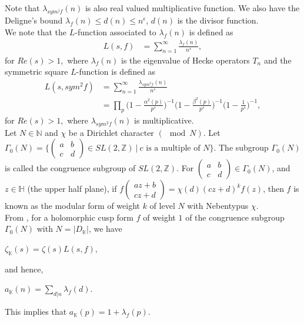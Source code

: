 \documentclass[preprint,12pt]{elsarticle}
\numberwithin{equation}{section}
\begin{document}
Note that $\lambda_{sym^{j}f}(n)$ is also real valued multiplicative function. We also have the Deligne's bound $\lambda_{f}(n)\leq d(n)\leq n^{\epsilon}$, $d(n)$ is the divisor function.\\
We note that the $L$-function associated to $\lambda_{f}(n)$ is defined as
\begin{align*}
	L(s,f)&=\sum_{n=1}^{\infty}\frac{\lambda_{f}(n)}{n^{s}}, 
\end{align*}
for $Re(s)>1,$ where $\lambda_{f}(n)$ is the eigenvalue of Hecke operators $T_{n}$ and the symmetric square $L$-function is defined as
\begin{align*}
	L(s,sym^{2}f)&=\sum\limits_{n=1}^{\infty}\frac{\lambda_{sym^{2}f}(n)}{n^{s}}\\
	&=\prod_{p} \Big(1-\frac{\alpha^{2}(p)}{p^{s}}\Big)^{-1}\Big(1-\frac{\beta^{2}(p)}{p^{s}}\Big)^{-1}\Big(1-\frac{1}{p^{s}}\Big)^{-1},
\end{align*}
for $Re(s)>1,$ where $\lambda_{sym^{2}f}(n)$ is multiplicative.\\
Let $N\in \mathbb{N}$ and $\chi$ be a Dirichlet character $(\mod N)$. Let $\Gamma_{0}(N)=\Big\{ \begin{pmatrix}
	a & b\\
	c & d
\end{pmatrix}
\in SL(2,\mathbb{Z})~\big|~\text{$c$ is a multiple of $N$}\Big\}$. The subgroup $\Gamma_{0}(N)$ is called the congruence subgroup of $SL(2,\mathbb{Z})$. For $\begin{pmatrix}
	a & b\\
	c & d
\end{pmatrix} \in \Gamma_{0}(N) $, and $z\in \mathbb{H}$ (the upper half plane), if $f \begin{pmatrix}
	az+b\\
	cz+d
\end{pmatrix}=\chi(d)(cz+d)^{k}f(z)$, then $f$ is known as the modular form of weight $k$ of level $N$ with Nebentypus $\chi$. \\
From \cite{P tiwari}, for a holomorphic cusp form  $f$ of weight $1$ of the congruence subgroup $\Gamma_{0}(N)$ with $N=|D_{\mathbb{K}}|$, we have 
\begin{center}
	$\zeta_{\mathbb{K}}(s)=\zeta(s)L(s,f),$
\end{center}
and hence,
\begin{center}
	$a_{\mathbb{K}}(n)=\sum\limits_{d|n}\lambda_{f}(d).$
\end{center}
This implies that $a_{\mathbb{K}}(p)=1+\lambda_{f}(p).$\\
\end{document}

